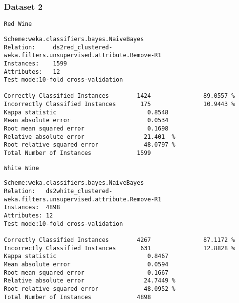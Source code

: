 \documentclass[a4paper,12pt,openany]{report}
\newenvironment{wekaconsole}[1][]{

	\par \noindent
	\begin{samepage}
	\texttt{#1}
	\begin{mdframed}
	\small
	\ttfamily
}{
	\end{mdframed}
	\end{samepage}
}
\begin{document}
\subsubsection*{Dataset 2}
\begin{wekaconsole}[Red Wine]
\begin{verbatim}
Scheme:weka.classifiers.bayes.NaiveBayes 
Relation:     ds2red_clustered-weka.filters.unsupervised.attribute.Remove-R1
Instances:    1599
Attributes:   12
Test mode:10-fold cross-validation

Correctly Classified Instances        1424               89.0557 %
Incorrectly Classified Instances       175               10.9443 %
Kappa statistic                          0.8548
Mean absolute error                      0.0534
Root mean squared error                  0.1698
Relative absolute error                 21.401  %
Root relative squared error             48.0797 %
Total Number of Instances             1599     
\end{verbatim}
\end{wekaconsole}

\begin{wekaconsole}[White Wine]
\begin{verbatim}
Scheme:weka.classifiers.bayes.NaiveBayes 
Relation:   ds2white_clustered-weka.filters.unsupervised.attribute.Remove-R1
Instances:  4898
Attributes: 12
Test mode:10-fold cross-validation

Correctly Classified Instances        4267               87.1172 %
Incorrectly Classified Instances       631               12.8828 %
Kappa statistic                          0.8467
Mean absolute error                      0.0594
Root mean squared error                  0.1667
Relative absolute error                 24.7449 %
Root relative squared error             48.0952 %
Total Number of Instances             4898
\end{verbatim}
\end{wekaconsole}
\end{document}
